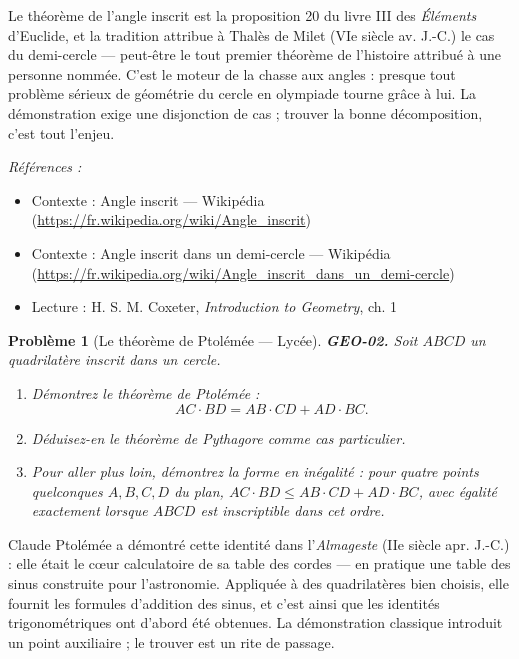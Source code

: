 \documentclass[11pt]{article}
\newtheorem{problem}{Problème}
\newenvironment{refs}{\par\small\noindent\emph{Références :}\begin{itemize}\setlength\itemsep{0pt}}{\end{itemize}\normalsize}
\begin{document}
\noindent Le théorème de l'angle inscrit est la proposition 20 du livre III des
\textit{Éléments} d'Euclide, et la tradition attribue à Thalès de Milet (VIe siècle
av. J.-C.) le cas du demi-cercle --- peut-être le tout premier théorème de l'histoire attribué
à une personne nommée. C'est le moteur de la \og{} chasse aux angles \fg{} : presque tout problème
sérieux de géométrie du cercle en olympiade tourne grâce à lui. La démonstration exige une
disjonction de cas ; trouver la bonne décomposition, c'est tout l'enjeu.

\begin{refs}
\item Contexte : Angle inscrit --- Wikipédia (\url{https://fr.wikipedia.org/wiki/Angle_inscrit})
\item Contexte : Angle inscrit dans un demi-cercle --- Wikipédia (\url{https://fr.wikipedia.org/wiki/Angle_inscrit_dans_un_demi-cercle})
\item Lecture : H. S. M. Coxeter, \textit{Introduction to Geometry}, ch. 1
\end{refs}

\bigskip

\begin{problem}[{Le théorème de Ptolémée --- Lycée}]
\textbf{GEO-02.} Soit $ ABCD $ un quadrilatère inscrit dans un cercle.
\begin{enumerate}
\item[(a)] Démontrez le théorème de Ptolémée :
\[ AC \cdot BD = AB \cdot CD + AD \cdot BC. \]
\item[(b)] Déduisez-en le théorème de Pythagore comme cas particulier.
\item[(c)] Pour aller plus loin, démontrez la forme en inégalité : pour \textit{quatre points quelconques}
$ A, B, C, D $ du plan, $ AC \cdot BD \le AB \cdot CD + AD \cdot BC $, avec
égalité exactement lorsque $ ABCD $ est inscriptible dans cet ordre.
\end{enumerate}

\end{problem}

\noindent Claude Ptolémée a démontré cette identité dans l'\textit{Almageste}
(IIe siècle apr. J.-C.) : elle était le c\oe{}ur calculatoire de sa table des cordes ---
en pratique une table des sinus construite pour l'astronomie. Appliquée à des quadrilatères
bien choisis, elle fournit les formules d'addition des sinus, et c'est ainsi que les identités
trigonométriques ont d'abord été obtenues. La démonstration classique introduit un point
auxiliaire ; le trouver est un rite de passage.
\end{document}
